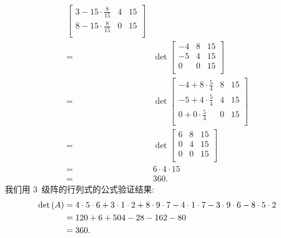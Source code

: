 \documentclass[../libro.tex]{subfiles}
\begin{document}
\begin{example}
\begin{align*}
{\begin{bmatrix}
                3 - 15 \cdot \frac{8}{15} & 4 & 15 \\
                8 - 15 \cdot \frac{8}{15} & 0 & 15 \\
            \end{bmatrix}
        }
        \\
        = {} &
        \det {
            \begin{bmatrix}
                -4 & 8 & 15 \\
                -5 & 4 & 15 \\
                0  & 0 & 15 \\
            \end{bmatrix}
        }
        \\
        = {} &
        \det {
            \begin{bmatrix}
                -4 + 8 \cdot \frac{5}{4} & 8 & 15 \\
                -5 + 4 \cdot \frac{5}{4} & 4 & 15 \\
                0 + 0 \cdot \frac{5}{4}  & 0 & 15 \\
            \end{bmatrix}
        }
        \\
        = {} &
        \det {
            \begin{bmatrix}
                6 & 8 & 15 \\
                0 & 4 & 15 \\
                0 & 0 & 15 \\
            \end{bmatrix}
        }
        \\
        = {} &
        6 \cdot 4 \cdot 15
        \\
        = {} &
        360.
    \end{align*}
    我们用 \(3\)~级阵的行列式的公式验证结果:
    \begin{align*}
        \det {(A)}
        = {} &
        4 \cdot 5 \cdot 6
        + 3 \cdot 1 \cdot 2
        + 8 \cdot 9 \cdot 7
        - 4 \cdot 1 \cdot 7
        - 3 \cdot 9 \cdot 6
        - 8 \cdot 5 \cdot 2
        \\
        = {} &
        120 + 6 + 504 - 28 - 162 - 80
        \\
        = {} & 360.
        \qedhere
    \end{align*}
\end{example}
\end{document}
